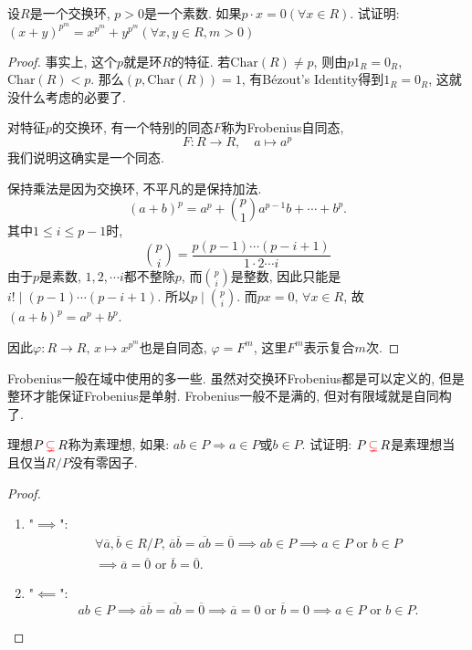 \documentclass{../solutions-cn}
\begin{document}
\begin{exercise}[习题2.1.2]
    设$R$是一个交换环, $p > 0$是一个素数. 如果$p \cdot x = 0 (\forall x\in R)$. 试证明: $(x + y)^{p^m} = x^{p^m}+y^{p^m} (\forall x, y \in R, m > 0)$
\end{exercise}

\begin{proof}
    事实上, 这个$p$就是环$R$的特征. 若$\mathrm{Char}(R) \neq p$, 则由$p1_R = 0_R$, $\mathrm{Char}(R) < p$. 那么$(p, \mathrm{Char}(R)) = 1$, 有Bézout's Identity得到$1_R = 0_R$, 这就没什么考虑的必要了.

    对特征$p$的交换环, 有一个特别的同态$F$称为Frobenius自同态,
    \[
        F: R \to R, \quad a \mapsto a^p
    \]
    我们说明这确实是一个同态.
    
    保持乘法是因为交换环, 不平凡的是保持加法.
    \[
        (a + b)^p = a^p + \binom{p}{1}a^{p - 1}b + \cdots + b^p.
    \]
    其中$1 \leqslant i \leqslant p - 1$时,
    \[
        \binom{p}{i} = \frac{p(p - 1) \cdots (p - i + 1)}{1 \cdot 2 \cdots i} 
    \]
    由于$p$是素数, $1, 2, \cdots i$都不整除$p$, 而$\binom{p}{i}$是整数, 因此只能是$i! \mid (p - 1) \cdots (p - i + 1)$. 所以$p \mid \binom{p}{i}$. 而$px = 0,\, \forall x \in R$, 故$(a + b)^p = a^p + b^p$.

    因此$\varphi: R \to R,\, x \mapsto x^{p^m}$也是自同态, $\varphi = F^m$, 这里$F^m$表示复合$m$次.
\end{proof}

\begin{remark}
    Frobenius一般在域中使用的多一些. 虽然对交换环Frobenius都是可以定义的, 但是整环才能保证Frobenius是单射. Frobenius一般不是满的, 但对有限域就是自同构了.
\end{remark}

\begin{exercise}[习题2.1.5]
    理想\(P \,\textcolor{red}{\subsetneq}\, R\)称为素理想, 如果: $ab \in P \Rightarrow a \in P$或$b \in P$. 试证明: \(P \,\textcolor{red}{\subsetneq}\, R\)是素理想当且仅当$R/P$没有零因子.
\end{exercise}

\begin{proof}
    \begin{enumerate}[(1)]
        \item "$\implies$":
        \[
        \begin{gathered}
            \forall \overline{a}, \overline{b} \in R/P,\, \overline{a}\overline{b} = \overline{ab} = \overline{0} \implies ab \in P \implies a \in P \text{ or } b \in P \\ \implies \overline{a} = \overline{0} \text{ or } \overline{b} = \overline{0}.
        \end{gathered}
        \]
        \item "$\impliedby$":
        \[
            ab \in P \implies \overline{a}\overline{b} = \overline{ab} = \overline{0} \implies \overline{a} = 0 \text{ or } \overline{b} = 0 \implies a \in P \text{ or } b \in P.
        \]
    \end{enumerate} 
\end{proof}
\end{document}
